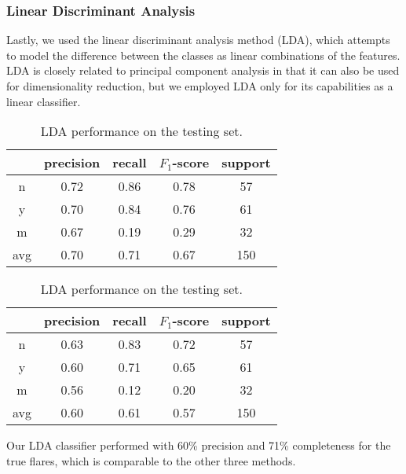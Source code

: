 \documentclass[11pt]{article}
\begin{document}
\subsubsection{Linear Discriminant Analysis}
\label{sec:lda}
Lastly, we used the linear discriminant analysis method (LDA), which
attempts to model the difference between the classes as linear
combinations of the features.  LDA is closely related to principal
component analysis in that it can also be used for dimensionality
reduction, but we employed LDA only for its capabilities as a linear
classifier.
\begin{table}
  \centering
  \begin{tabular}[!htbp]{c|c c c c}
       & precision &recall &$F_1$-score &support \\ \hline
    n  & 0.72      &0.86   &0.78     &57      \\
    y  & 0.70      &0.84   &0.76     &61      \\
    m  & 0.67      &0.19   &0.29     &32      \\ \hline
    avg& 0.70      &0.71   &0.67     &150     \\
  \end{tabular}
  \caption{Reconstructing the training set with LDA.}

  \begin{tabular}[!htbp]{c|c c c c}
        & precision &recall &$F_1$-score &support \\ \hline
    n   & 0.63      &0.83   &0.72     &57      \\
    y   & 0.60      &0.71   &0.65     &61      \\
    m   & 0.56      &0.12   &0.20     &32      \\ \hline
    avg & 0.60      &0.61   &0.57     &150     \\
  \end{tabular}
  \caption{LDA performance on the testing set.}
\end{table}
Our LDA classifier performed with 60\% precision and 71\% completeness
for the true flares, which is comparable to the other three methods.

\end{document}
